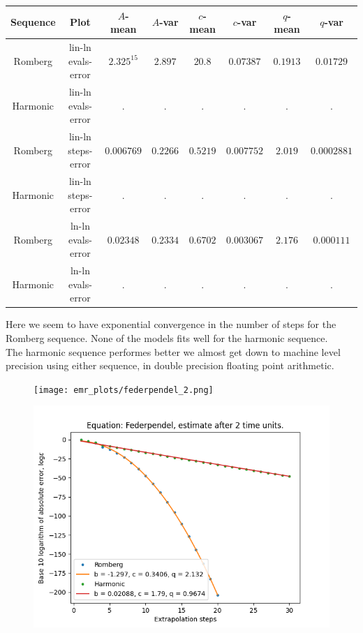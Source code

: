 \begin{table}[H]
    \centering
    \small
     \begin{tabular}{c|c||c|c|c|c|c|c}
Sequence & Plot & \(A\)-mean & \(A\)-var & \(c\)-mean & \(c\)-var & \(q\)-mean & \(q\)-var\\\hline
Romberg & lin-ln evals-error & \(2.325^{15}\) & \(2.897\) & \(20.8\) & \(0.07387\) & \(0.1913\) & \(0.01729\) \\
Harmonic & lin-ln evals-error & . & . & . & . & . & . \\
Romberg & lin-ln steps-error & \(0.006769\) & \(0.2266\) & \(0.5219\) & \(0.007752\) & \(2.019\) & \(0.0002881\) \\
Harmonic & lin-ln steps-error & . & . & . & . & . & . \\
Romberg & ln-ln evals-error & \(0.02348\) & \(0.2334\) & \(0.6702\) & \(0.003067\) & \(2.176\) & \(0.000111\) \\
Harmonic & ln-ln evals-error & . & . & . & . & . & . \\
    \end{tabular}
    \label{tab:my_label}
\end{table}

Here we seem to have exponential convergence in the number of steps for the Romberg sequence. None of the models fits well for the harmonic sequence.\\

The harmonic sequence performes better we almost get down to machine level precision using either sequence, in double precision floating point arithmetic. 

\begin{figure}[H]
\centering
\begin{minipage}{0.45\textwidth}
\centering
\texttt{[image: emr\_plots/federpendel\_2.png]}
\end{minipage}
\begin{minipage}{0.45\textwidth}
\centering
\includegraphics[scale=0.45]{emr_plots/federpendel_2_hp_steps.png}
\end{minipage}
\end{figure}

